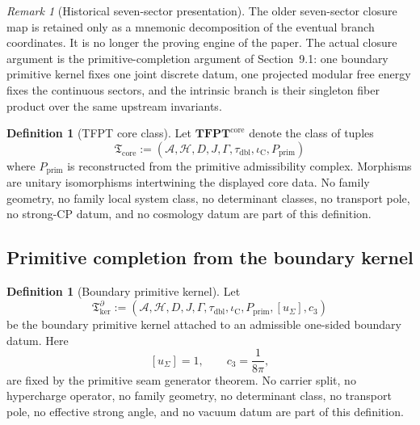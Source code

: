 \documentclass[11pt,a4paper]{article}
\theoremstyle{definition}
\newtheorem{definition}[theorem]{Definition}
\theoremstyle{remark}
\newtheorem*{remark}{Remark}
\newcommand{\taudbl}{\tau_{\mathrm{dbl}}}
\newcommand{\iC}{\iota_{\mathrm C}}
\newcommand{\cthree}{c_3}
\newcommand{\Tcore}{\mathfrak T_{\mathrm{core}}}
\newcommand{\Tker}{\mathfrak T_{\mathrm{ker}}}
\newcommand{\Pprim}{P_{\mathrm{prim}}}
\begin{document}
\begin{remark}[Historical seven-sector presentation]
The older seven-sector closure map is retained only as a mnemonic decomposition of the eventual
branch coordinates. It is no longer the proving engine of the paper. The actual closure argument is
the primitive-completion argument of Section~9.1: one boundary primitive kernel fixes one joint
discrete datum, one projected modular free energy fixes the continuous sectors, and the intrinsic
branch is their singleton fiber product over the same upstream invariants.
\end{remark}

\begin{definition}[TFPT core class]
\label{def:tfpt-core-class}
Let $\mathbf{TFPT}^{\mathrm{core}}$ denote the class of tuples
\[
\Tcore:=(\mathcal A,\mathcal H,D,J,\Gamma,\taudbl,\iC,\Pprim)
\]
where $\Pprim$ is reconstructed from the primitive admissibility complex. Morphisms are unitary
isomorphisms intertwining the displayed core data. No family geometry, no family local system
class, no determinant classes, no transport pole, no strong-CP datum, and no cosmology datum are
part of this definition.
\end{definition}

\subsection{Primitive completion from the boundary kernel}

\begin{definition}[Boundary primitive kernel]
\label{def:boundary-primitive-kernel}
\label{def:post-carrier-primitive-kernel}
Let
\[
\Tker^\partial
:=
(\mathcal A,\mathcal H,D,J,\Gamma,\taudbl,\iC,\Pprim,[u_\Sigma],\cthree)
\]
be the boundary primitive kernel attached to an admissible one-sided boundary datum. Here
\[
[u_\Sigma]=1,
\qquad
\cthree=\frac{1}{8\pi},
\]
are fixed by the primitive seam generator theorem. No carrier split, no hypercharge operator, no
family geometry, no determinant class, no transport pole, no effective strong angle, and no
vacuum datum are part of this definition.
\end{definition}
\end{document}
